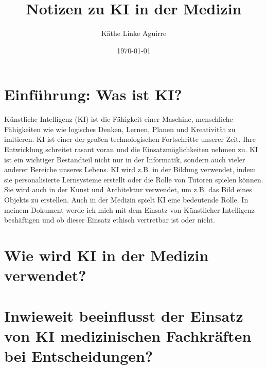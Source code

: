 \documentclass{article}
\title{Notizen zu KI in der Medizin}
\author{Käthe Linke Aguirre}
\date{\today}
\begin{document}
\maketitle


    \tableofcontents

\section { Einführung: Was ist KI? }

   
Künstliche Intelligenz (KI) ist die Fähigkeit einer Maschine, menschliche Fähigkeiten wie
wie logisches Denken, Lernen, Planen und Kreativität zu imitieren. KI ist einer der 
großen technologischen Fortschritte unserer Zeit. Ihre Entwicklung schreitet 
rasant voran und die Einsatzmöglichkeiten nehmen zu. KI ist ein wichtiger Bestandteil nicht nur in der Informatik,
sondern auch vieler anderer Bereiche unseres Lebens. KI wird z.B. in der Bildung verwendet, indem sie personalisierte
Lernsysteme erstellt oder die Rolle von Tutoren spielen können. Sie wird auch in der Kunst 
und Architektur verwendet, um z.B. das Bild eines Objekts zu erstellen.
Auch in der Medizin spielt KI eine bedeutende Rolle. In meinem Dokument werde ich mich
mit dem Einsatz von Künstlicher Intelligenz beshäftigen und ob dieser Einsatz
ethisch vertretbar ist oder nicht. 


\section{Wie wird KI in der Medizin verwendet?}


\section{Inwieweit beeinflusst der Einsatz von KI medizinischen
 Fachkräften bei Entscheidungen?}

\section {}








\printbibliography
\end{document}
